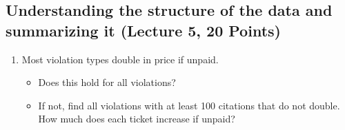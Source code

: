 \documentclass[
  letterpaper,
  DIV=11,
  numbers=noendperiod]{scrartcl}
\providecommand{\tightlist}{%
  \setlength{\itemsep}{0pt}\setlength{\parskip}{0pt}}\usepackage{longtable,booktabs,array}
\begin{document}
\subsection{Understanding the structure of the data and summarizing it
(Lecture 5, 20
Points)}\label{understanding-the-structure-of-the-data-and-summarizing-it-lecture-5-20-points}

\begin{enumerate}
\def\labelenumi{\arabic{enumi}.}
\setcounter{enumi}{3}
\tightlist
\item
  Most violation types double in price if unpaid.

  \begin{itemize}
  \tightlist
  \item
    Does this hold for all violations?
  \item
    If not, find all violations with at least 100 citations that do not
    double. How much does each ticket increase if unpaid?
  \end{itemize}
\end{enumerate}
\end{document}
